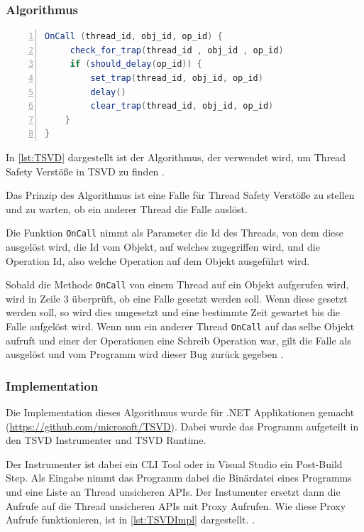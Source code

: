 \subsubsection*{Algorithmus}

\begin{lstlisting}[language=Java,frame=tb,caption={\acs{TSVD} Trap Mechanism}, label={lst:TSVD}, numbers=left, stepnumber=1]
OnCall (thread_id, obj_id, op_id) { 
     check_for_trap(thread_id , obj_id , op_id) 
     if (should_delay(op_id)) {
         set_trap(thread_id, obj_id, op_id)
         delay()
         clear_trap(thread_id, obj_id, op_id)
    }
}
\end{lstlisting}

In \ref{lst:TSVD} dargestellt ist der Algorithmus, der verwendet wird, um Thread Safety Verstöße in \acs{TSVD} zu finden \cite[Figure 5,][166]{li_efficient_2019}. 

Das Prinzip des Algorithmus ist eine Falle für Thread Safety Verstöße zu stellen und zu warten, ob ein anderer Thread die Falle auslöst. 

Die Funktion \texttt{OnCall} nimmt als Parameter die Id des Threads, von dem diese ausgelöst wird, die Id vom Objekt, auf welches zugegriffen wird, und die Operation Id, also welche Operation auf dem Objekt ausgeführt wird.

Sobald die Methode \texttt{OnCall} von einem Thread auf ein Objekt aufgerufen wird, wird in Zeile 3 überprüft, ob eine Falle gesetzt werden soll. Wenn diese gesetzt werden soll, so wird dies umgesetzt und eine bestimmte Zeit gewartet bis die Falle aufgelöst wird. Wenn nun ein anderer Thread \texttt{OnCall} auf das selbe Objekt aufruft und einer der Operationen eine Schreib Operation war, gilt die Falle als ausgelöst und vom Programm wird dieser Bug zurück gegeben \cite[vgl.][166]{li_efficient_2019}.

\subsubsection*{Implementation}

Die Implementation dieses Algorithmus wurde für .NET Applikationen gemacht (\url{https://github.com/microsoft/TSVD}). Dabei wurde das Programm aufgeteilt in den \acs{TSVD} Instrumenter und \acs{TSVD} Runtime.  

Der Instrumenter ist dabei ein \ac{CLI} Tool oder in Visual Studio ein Post-Build Step. Als Eingabe nimmt das Programm dabei die Binärdatei eines Programms und eine Liste an Thread unsicheren \ac{API}s. Der Instumenter ersetzt dann die Aufrufe auf die Thread unsicheren \acs{API}s mit Proxy Aufrufen. Wie diese Proxy Aufrufe funktionieren, ist in \ref{lst:TSVDImpl} dargestellt. \cite[vgl.][170]{li_efficient_2019}.

